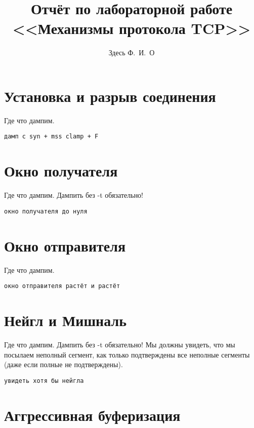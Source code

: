 \documentclass[a4paper,12pt]{article}
\title{Отчёт по лабораторной работе \\ <<Механизмы протокола TCP>>}
\author{Здесь Ф.~И.~О}
\begin{document}
\maketitle

\tableofcontents


\section{Установка и разрыв соединения}

Где что дампим.

\begin{Verbatim}
дамп с syn + mss clamp + F
\end{Verbatim}

\section{Окно получателя}

Где что дампим.  Дампить без -t обязательно!

\begin{Verbatim}
окно получателя до нуля
\end{Verbatim}

\section{Окно отправителя}

Где что дампим.

\begin{Verbatim}
окно отправителя растёт и растёт
\end{Verbatim}

\section{Нейгл и Мишналь}

Где что дампим.  Дампить без -t обязательно!
Мы должны увидеть, что мы посылаем неполный сегмент, как только подтверждены все неполные сегменты (даже если полные не подтверждены).

\begin{Verbatim}
увидеть хотя бы нейгла
\end{Verbatim}

\section{Аггрессивная буферизация}
\end{document}
